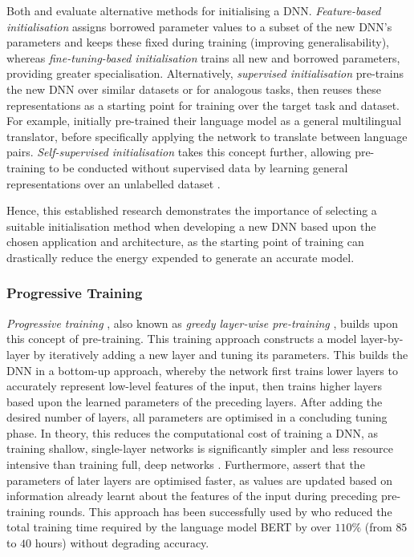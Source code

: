 \documentclass[a4paper, 11pt]{report}
\begin{document}
    Both \citet{hanin-2018} and \citet{xu-2021} evaluate alternative methods for initialising a DNN. \emph{Feature-based initialisation} assigns borrowed parameter values to a subset of the new DNN's parameters and keeps these fixed during training (improving generalisability), whereas \emph{fine-tuning-based initialisation} trains all new and borrowed parameters, providing greater specialisation. Alternatively, \emph{supervised initialisation} pre-trains the new DNN over similar datasets or for analogous tasks, then reuses these representations as a starting point for training over the target task and dataset. For example, \citet{lin-2021} initially pre-trained their language model as a general multilingual translator, before specifically applying the network to translate between language pairs. \emph{Self-supervised initialisation} takes this concept further, allowing pre-training to be conducted without supervised data by learning general representations over an unlabelled dataset \citep{peters-2018}.

    Hence, this established research demonstrates the importance of selecting a suitable initialisation method when developing a new DNN based upon the chosen application and architecture, as the starting point of training can drastically reduce the energy expended to generate an accurate model.


    \subsubsection{Progressive Training}
    \label{section: progressive-training}

    \emph{Progressive training} \citep{xu-2021}, also known as \emph{greedy layer-wise pre-training} \citep{xu-2018}, builds upon this concept of pre-training. This training approach constructs a model layer-by-layer by iteratively adding a new layer and tuning its parameters. This builds the DNN in a bottom-up approach, whereby the network first trains lower layers to accurately represent low-level features of the input, then trains higher layers based upon the learned parameters of the preceding layers. After adding the desired number of layers, all parameters are optimised in a concluding tuning phase. In theory, this reduces the computational cost of training a DNN, as training shallow, single-layer networks is significantly simpler and less resource intensive than training full, deep networks \citep{xu-2021}. Furthermore, \citet{xu-2021} assert that the parameters of later layers are optimised faster, as values are updated based on information already learnt about the features of the input during preceding pre-training rounds. This approach has been successfully used by \citet{yang-2020} who reduced the total training time required by the language model BERT by over $110\%$ (from $85$ to $40$ hours) without degrading accuracy.
\end{document}
